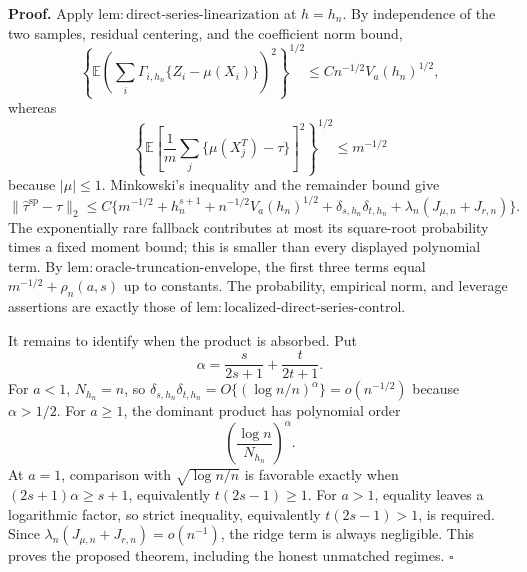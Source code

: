 \textbf{Proof.}
Apply \(\mathrm{lem:direct\text{-}series\text{-}linearization}\) at \(h=h_n\).  By independence of the two samples, residual centering, and the coefficient norm bound,
\[
\left\{\mathbb E\left(\sum_i\Gamma_{i,h_n}\{Z_i-\mu(X_i)\}\right)^2\right\}^{1/2}
\le Cn^{-1/2}V_a(h_n)^{1/2},
\]
whereas
\[
\left\{\mathbb E\left[\frac1m\sum_j\{\mu(X_j^T)-\tau\}\right]^2\right\}^{1/2}
\le m^{-1/2}
\]
because \(|\mu|\le1\).  Minkowski's inequality and the remainder bound give
\[
\|\widehat\tau^{\mathrm{sp}}-\tau\|_2
\le C\{m^{-1/2}+h_n^{s+1}+n^{-1/2}V_a(h_n)^{1/2}
+\delta_{s,h_n}\delta_{t,h_n}+\lambda_n(J_{\mu,n}+J_{r,n})\}.
\]
The exponentially rare fallback contributes at most its square-root probability times a fixed moment bound; this is smaller than every displayed polynomial term.  By \(\mathrm{lem:oracle\text{-}truncation\text{-}envelope}\), the first three terms equal \(m^{-1/2}+\rho_n(a,s)\) up to constants.  The probability, empirical norm, and leverage assertions are exactly those of \(\mathrm{lem:localized\text{-}direct\text{-}series\text{-}control}\).

It remains to identify when the product is absorbed.  Put
\[
\alpha=\frac{s}{2s+1}+\frac{t}{2t+1}.
\]
For \(a<1\), \(N_{h_n}=n\), so \(\delta_{s,h_n}\delta_{t,h_n}=O\{(\log n/n)^\alpha\}=o(n^{-1/2})\) because \(\alpha>1/2\).  For \(a\ge1\), the dominant product has polynomial order
\[
\left(\frac{\log n}{N_{h_n}}\right)^\alpha.
\]
At \(a=1\), comparison with \(\sqrt{\log n/n}\) is favorable exactly when \((2s+1)\alpha\ge s+1\), equivalently \(t(2s-1)\ge1\).  For \(a>1\), equality leaves a logarithmic factor, so strict inequality, equivalently \(t(2s-1)>1\), is required.  Since \(\lambda_n(J_{\mu,n}+J_{r,n})=o(n^{-1})\), the ridge term is always negligible.  This proves the proposed theorem, including the honest unmatched regimes. \(\square\)